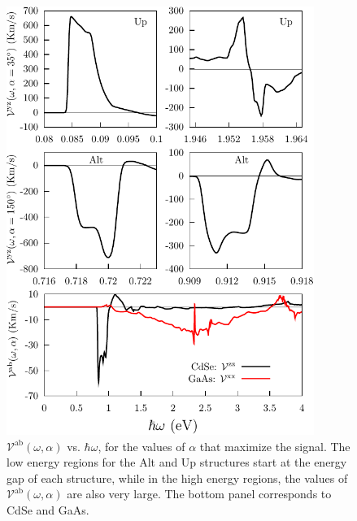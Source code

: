 \documentclass[floatfix,prb,aps,superscriptaddress,showpacs,11pt,preprint,letterpaper]{revtex4}
\def\tama{10cm}
\begin{document}
\begin{figure}[t]
\centering
\includegraphics[width=\tama]{plots/2-vab-str-comp}
\caption{$\mathcal{V}^{\mathrm{ab}}(\omega,\alpha)$ 
  vs. $\hbar\omega$, for the values of $\alpha$ that maximize the signal. The
  low energy regions for the Alt and Up structures start at the energy gap of
  each structure, while in the high energy regions, the values of
  $\mathcal{V}^{\mathrm{ab}}(\omega,\alpha)$ are also very large. The bottom
  panel corresponds to CdSe and GaAs. }
\label{fig:vab-str-comp}
\end{figure}
\end{document}

